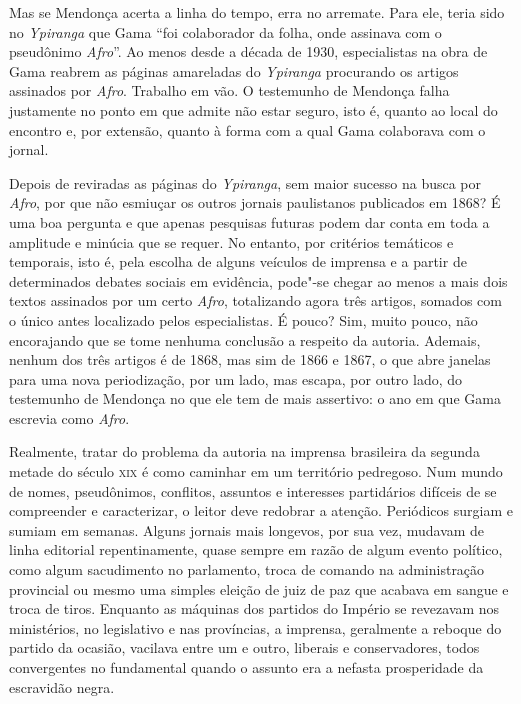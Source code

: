 Mas se Mendonça acerta a linha do tempo, erra no arremate. Para ele,
teria sido no \emph{Ypiranga} que Gama ``foi colaborador da folha, onde
assinava com o pseudônimo \emph{Afro}''. Ao menos desde a década de 1930,
especialistas na obra de Gama reabrem as páginas amareladas do 
\emph{Ypiranga} procurando os artigos assinados por \emph{Afro}. Trabalho 
em vão. O testemunho de Mendonça falha justamente no ponto em que admite
não estar seguro, isto é, quanto ao local do encontro e, por extensão,
quanto à forma com a qual Gama colaborava com o jornal.

Depois de reviradas as páginas do \emph{Ypiranga}, sem maior sucesso na
busca por \emph{Afro}, por que não esmiuçar os outros jornais
paulistanos publicados em 1868? É uma boa pergunta e que apenas
pesquisas futuras podem dar conta em toda a amplitude e minúcia que se
requer. No entanto, por critérios temáticos e temporais, isto é, pela
escolha de alguns veículos de imprensa e a partir de determinados
debates sociais em evidência, pode"-se chegar ao menos a mais dois textos
assinados por um certo \emph{Afro}, totalizando agora três artigos,
somados com o único antes localizado pelos especialistas. É pouco? Sim,
muito pouco, não encorajando que se tome nenhuma conclusão a respeito da
autoria. Ademais, nenhum dos três artigos é de 1868, mas sim de 1866 e
1867, o que abre janelas para uma nova periodização, por um lado, mas
escapa, por outro lado, do testemunho de Mendonça no que ele tem de mais
assertivo: o ano em que Gama escrevia como \emph{Afro}.

Realmente, tratar do problema da autoria na imprensa brasileira da
segunda metade do século \textsc{xix} é como caminhar em um território pedregoso.
Num mundo de nomes, pseudônimos, conflitos, assuntos e interesses
partidários difíceis de se compreender e caracterizar, o leitor deve
redobrar a atenção. Periódicos surgiam e sumiam em semanas. Alguns
jornais mais longevos, por sua vez, mudavam de linha editorial
repentinamente, quase sempre em razão de algum evento político, como
algum sacudimento no parlamento, troca de comando na administração
provincial ou mesmo uma simples eleição de juiz de paz que acabava em
sangue e troca de tiros. Enquanto as máquinas dos partidos do Império se
revezavam nos ministérios, no legislativo e nas províncias, a imprensa,
geralmente a reboque do partido da ocasião, vacilava entre um e outro,
liberais e conservadores, todos convergentes no fundamental quando o
assunto era a nefasta prosperidade da escravidão negra.

